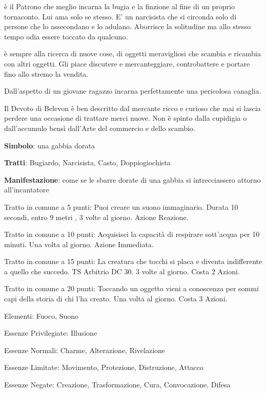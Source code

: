 \documentclass[a4paper,11pt,twoside,openany]{book}
\begin{document}
\label{belevon}

è il Patrono che meglio incarna la bugia e la finzione al fine di un proprio tornaconto. Lui ama solo se stesso. E' un narcisista che si circonda solo di persone che lo assecondano e lo adulano. Aborrisce la solitudine ma allo stesso tempo odia essere toccato da qualcuno.

è sempre alla ricerca di nuove cose, di oggetti meravigliosi che scambia e ricambia con altri oggetti. Gli piace discutere e mercanteggiare, controbattere e portare fino allo stremo la vendita.

Dall'aspetto di un giovane ragazzo incarna perfettamente una pericolosa canaglia.

Il Devoto di Belevon è ben descritto dal mercante ricco e curioso che mai si lascia perdere una occasione di trattare merci nuove. Non è spinto dalla cupidigia o dall'accumulo bensì dall'Arte del commercio e dello scambio.

\textbf{Simbolo}: una gabbia dorata

\textbf{Tratti}: Bugiardo, Narcisista, Casto, Doppiogiochista

\textbf{Manifestazione}: come se le sbarre dorate di una gabbia si intrecciassero attorno all'incantatore

\bigskip

Tratto in comune a 5 punti: Puoi creare un suono immaginario. Durata 10 secondi, entro 9 metri , 3 volte al giorno. Azione Reazione.

Tratto in comune a 10 punti: Acquisisci la capacità di respirare sott'acqua per 10 minuti. Una volta al giorno. Azione Immediata.

Tratto in comune a 15 punti: La creatura che tocchi si placa e diventa indifferente a quello che succedo. TS Arbitrio DC 30. 3 volte al giorno. Costa 2 Azioni.

Tratto in comune a 20 punti: Toccando un oggetto vieni a conoscenza per sommi capi della storia di chi l'ha creato. Una volta al giorno. Costa 3 Azioni.

\bigskip

Elementi: Fuoco, Suono

\bigskip

Essenze Privilegiate: Illusione

Essenze Normali: Charme, Alterazione, Rivelazione

Essenze Limitate: Movimento, Protezione, Distruzione, Attacco

Essenze Negate: Creazione, Trasformazione, Cura, Convocazione, Difesa
\end{document}

